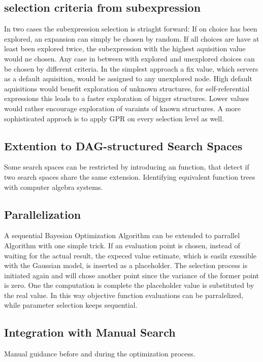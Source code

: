 \documentclass[english]{article}
\begin{document}
\subsection*{selection criteria from subexpression}
In two cases the subexpression selection is striaght forward: If on choice has been explored, an expansion can simply be chosen by random. If all choices are have at least been explored twice, the subexpression with the highest aquisition value would ne chosen. Any case in between with explored and unexplored choices can be chosen by different criteria.
In the simplest approach a fix value, which servers as a default aquisition, would be assigned to any unexplored node. High default aquisitions would benefit exploration of unknown structures, for self-referential expressions this leads to a faster exploration of bigger structures. Lower values would rather encourage exploration of varaints of known structures.
A more sophisticated approch is to apply \ac{GPR} on every selection level as well.


\subsection{Extention to DAG-structured Search Spaces}
Some search spaces can be restricted by introducing an function, that detect if two search spaces share the same extension.
Identifying equivalent function trees with computer algebra systems.

\subsection{Parallelization}
A sequential Bayesian Optimization Algorithm can be extended to parrallel Algorithm with one simple trick. If an evaluation point is chosen, instead of waiting for the actual result, the expeced value estimate, which is easilz exessible with the Gaussian model, is inserted as a placeholder. The selection process is initiated again and will chose another point since the variance of the former point is zero. One the computation is complete the placeholder value is substituted by the real value. In this way objective function evaluations can be parralelized, while parameter selection keeps sequential.


\subsection{Integration with Manual Search}
Manual guidance before and during the optimization process.
\end{document}
